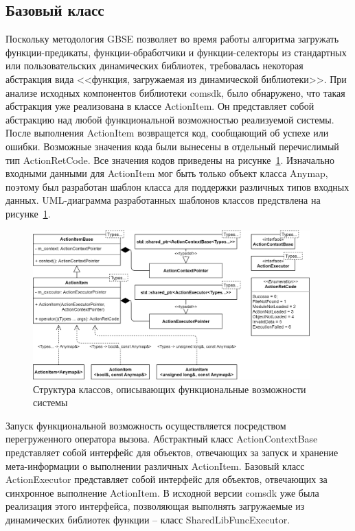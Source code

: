 \subsection{Базовый класс}
Поскольку методология GBSE позволяет во время работы алгоритма загружать функции-предикаты, функции-обработчики и функции-селекторы из стандартных или пользовательских динамических библиотек, требовалась некоторая абстракция вида <<функция, загружаемая из динамической библиотеки>>. При анализе исходных компонентов библиотеки comsdk, было обнаружено, что такая абстракция уже реализована в классе \textsf{ActionItem}. Он представляет собой абстракцию над любой функциональной возможностью реализуемой системы. После выполнения \textsf{ActionItem} возвращется код, сообщающий об успехе или ошибки. Возможные значения кода были вынесены в отдельный перечислимый тип \textsf{ActionRetCode}. Все значения кодов приведены на рисунке~\ref{fig:UMLActionItems}. Изначально входными данными для \textsf{ActionItem} мог быть только объект класса \textsf{Anymap}, поэтому был разработан шаблон класса для поддержки различных типов входных данных. UML-диаграмма разработанных шаблонов классов предствлена на рисунке~\ref{fig:UMLActionItems}.
\begin{figure}[!ht]
    \centering
    \includegraphics[width=0.95\textwidth]{figures/UML.actionItem.png}
    \caption{Структура классов, описывающих функциональные возможности системы}
    \label{fig:UMLActionItems}
\end{figure}

Запуск функциональной возможность осуществляется посредством перегруженного оператора вызова. Абстрактный класс \textsf{ActionContextBase} представляет собой интерфейс для объектов, отвечающих за запуск и хранение мета-информации о выполнении различных \textsf{ActionItem}. Базовый класс \textsf{ActionExecutor} представляет собой интерфейс для объектов, отвечающих за синхронное выполнение \textsf{ActionItem}. В исходной версии comsdk уже была реализация этого интерфейса, позволяющая выполнять загружаемые из динамических библиотек функции -- класс \textsf{SharedLibFuncExecutor}.

